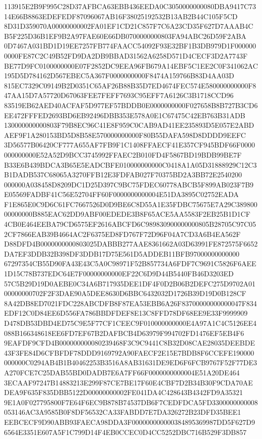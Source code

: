 \documentclass[UTF8,fontset=fandol,zihao=-4,a4paper]{ctexart}
\begin{document}
{{113915E2B9F995C28D37AFBCA63EBB436EEDA0C3050000000080DBA9417C7314E66B8863EDEFEDF87096067AB16F38025192532B13AB2B44C105F5CD
8D31D359070A00000000002FA01EF1CD21C857F7C6A23CD35F627D7AAAB4CB5F225D36B1EF9B2A97FAE60E66DB0700000000803FA94ABC26D59F2ABA
0D7467A031BD1D19EE7257FB774FAACC54092F93E32BF1B3DB979D1F0000000000FE87C2C49B52FD9DA2DB9BBAD31562A6258D571D4CECF3D2A7743F
BE77D9FC0100000000E07F2852DC9EEA96FB679A14EBF5C1EE2C0F341062AC195D5D784162D567EBEC5A367F0000000000F8474A159766B83D4AA03D
815EC7329C09149B2D0351C65AF26B88B35D7ED4674FEC574E580000000000F847AA15D7A57720D67063FEE7FEFF7693C95EFF7A6126C3B1718CCD96
83519EB62AED40ACFAF5D977EF57BDDB0E0000000000F027658B8B727B3CD6EE472FFFED2693BD6EB92496DBB353E578A0E1C67475C42EB763B31ADB
130000000000803F79B8EC96C41E8F959C0CAB9AD41EE235893D5E057E2ABDAEF9F1A280153BD5D8B58E570000000000F80B55DAFA598D8DDDD9EEFC
3D56577B06420CF777A655AF7FB9F1C1408FFAECF41E357CF945BDF66F0000000000000E52A52D9BCC3745992FFAEC2B010FD4F5867BD19BDB99BE7F
B33E6B439BDCA3B65E5EADCBFE010000000000C0418A1A05D31888929C12C3B1DADB537C68065A3270FFB12E3FDFAB027F70375BD2A3BB72E2540200
000000A038458D8209DC1D25D397C9BC75FDEC60778ABCB5F899AB023F7B9E05569FADBF41C56E52704FF60F0000000000004E51DA3895C02752EADA
F1E865E0C9D6C61FC7667526D0D9BE6C8D55A1E35FDBC75675E7A29C38980000000000B885EAC62DD9ABF00EDEDE3B8F65ACE5AA5583F2EB25B1D1CF
4CB0E464EEBA79CD6575EF2616ABCFD6C989830900000000805B28705C97C052CF7866EAB39B4664AC2F6375ED8FD767F72D96F04A7CD3A6B4EA562F
D88DFD4B0000000000803025DABBB277AAE8361662A03D63991FE872575F6652DA7EF3DDB32B398DF3DDB17D75E561D5ADDEB11BFB97000000000000
67297354CB55D90FA43E43C5A0C98971F52B857734A6FDF7C9691C5826F6AEE1D15C78B737EDC64E7F00000000000EF22C6D9D44B5440FB46D3203ED
57C5B29D19D0AEBE0C34A6B717935DEE1DF4F0D2B06B2DEFC275D9702A0100000000702F2F3DAE90A5DEE8630D6BBC6432032D1726B39D19D0B128CF
8A42DB8ED7021FDC228ABCDFB8F87EA53EBB6A26F83700000000000047F834EDF12C0D84EE6D556FA786BBDFDEF8E13C8FFD78DF68EE9E33F9999909
D478DB53DBD4ED75C9E5F77CF1CEEC9F010000000000E4A97A1C4C5126EE4088B166348618EE6FD7EF67B2DAFBCB4D63979F994702FD1476EF5EB4F6
9EAFDF9CFD4B000000000080239468F3C9C9441C8B32D08CAE28035DEEBDE43F3FE84D6CFBFDF78DDD9169792A90FAECF2E15E7BDB8F6CCEFE190000
000000C0294AB4B1B40462253B3516A8AB31631DE9ED6F6FCB9767F52F77DE3A270FCE7C25DAB55BD0DADB7E6A7FF66F0000000000004E51A20DE464
3ECAAF97247B14883213E299F87CE7BE17F60E4CBF7D2B34B30F9CDA70AEDEA9F635F835DBB5122D00000000002FE041DA4C428643B4342FD9A35321
9E1A0F027795800F7E64F6EC9B878B74537DB6F7CEDFDCA5FD3300000000008053146AC3A9585B0F8DF56532CA33FABDD7E7DA326272B23DFD35BEE1
EEBCECF9D90ABB93FAECA98DDA3F000000000000384895369987DD5F627D96564E3351E607A5F1C799D14F4EB0CCEC0D4CC5252DBC716B529F3DB857
}}
\end{document}
